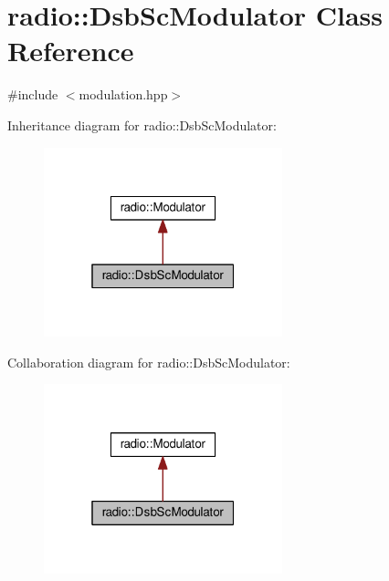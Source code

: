 \hypertarget{classradio_1_1DsbScModulator}{\section{radio\+:\+:Dsb\+Sc\+Modulator Class Reference}
\label{classradio_1_1DsbScModulator}
}


{\ttfamily \#include $<$modulation.\+hpp$>$}



Inheritance diagram for radio\+:\+:Dsb\+Sc\+Modulator\+:
\nopagebreak
\begin{figure}[H]
\begin{center}
\leavevmode
\includegraphics[width=196pt]{classradio_1_1DsbScModulator__inherit__graph}
\end{center}
\end{figure}


Collaboration diagram for radio\+:\+:Dsb\+Sc\+Modulator\+:
\nopagebreak
\begin{figure}[H]
\begin{center}
\leavevmode
\includegraphics[width=196pt]{classradio_1_1DsbScModulator__coll__graph}
\end{center}
\end{figure}
